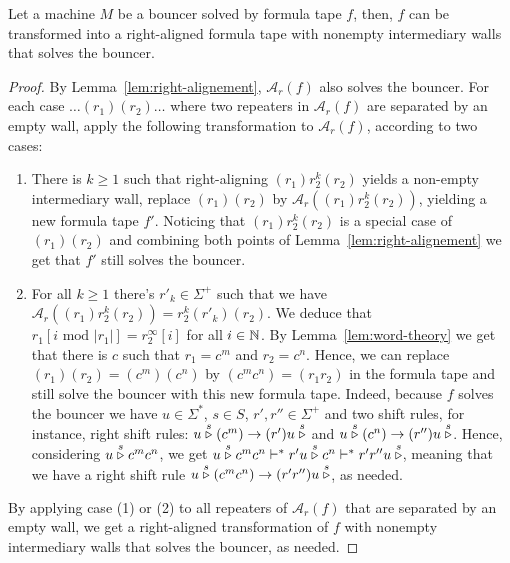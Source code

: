 \begin{lemma}\label{lem:formula-tapes-WLOG}
    Let a machine $M$ be a bouncer solved by formula tape $f$, then, $f$ can be transformed into a right-aligned formula tape with nonempty intermediary walls that solves the bouncer.
\end{lemma}
\begin{proof}
    By Lemma~\ref{lem:right-alignement}, $\mathcal{A}_r(f)$ also solves the bouncer. For each case $\dots (r_1)(r_2) \dots$ where two repeaters in $\mathcal{A}_r(f)$ are separated by an empty wall, apply the following transformation to $\mathcal{A}_r(f)$, according to two cases:

    \begin{enumerate}
        \item There is $k\geq 1$ such that right-aligning $(r_1)r_2^k(r_2)$ yields a non-empty intermediary wall, replace $(r_1)(r_2)$ by $\mathcal{A}_r((r_1)r_2^k(r_2))$, yielding a new formula tape $f'$. Noticing that $(r_1)r_2^k(r_2)$ is a special case of $(r_1)(r_2)$ and combining both points of Lemma~\ref{lem:right-alignement} we get that $f'$ still solves the bouncer.

        \item For all $k\geq 1$ there's $r'_k\in\Sigma^+$ such that we have $\mathcal{A}_r((r_1)r_2^k(r_2)) = r_2^k (r'_k)(r_2)$. We deduce that $r_1[i \text{ mod } |r_1|] = r_2^\infty[i]$ for all $i\in\mathbb{N}$. By Lemma~\ref{lem:word-theory} we get that there is $c$ such that $r_1 = c^m$ and $r_2 = c^n$. Hence, we can replace $(r_1)(r_2) = (c^m)(c^n)$ by $(c^m c^n) = (r_1 r_2)$ in the formula tape and still solve the bouncer with this new formula tape. Indeed, because $f$ solves the bouncer we have $u \in\Sigma^*$, $s\in S$, $r', r'' \in \Sigma^+$ and two shift rules, for instance, right shift rules: $u \stackrel{s}\triangleright (c^m) \to (r') u \stackrel{s}\triangleright$ and $u \stackrel{s}\triangleright (c^n) \to (r'') u \stackrel{s}\triangleright$. Hence, considering $u  \stackrel{s}\triangleright c^m c^n$, we get $u  \stackrel{s}\triangleright c^m c^n \vdash^* r' u  \stackrel{s}\triangleright c^n \vdash^* r' r'' u  \stackrel{s}\triangleright$, meaning that we have a right shift rule $u \stackrel{s}\triangleright (c^m c^n) \to (r'r'') u \stackrel{s}\triangleright$, as needed.

    \end{enumerate}

    By applying case (1) or (2) to all repeaters of $\mathcal{A}_r(f)$ that are separated by an empty wall, we get a right-aligned transformation of $f$ with nonempty intermediary walls that solves the bouncer, as needed.

\end{proof}


